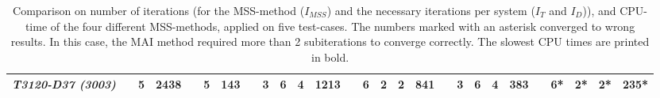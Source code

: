 \documentclass[10pt,journal]{article}
\begin{document}
\begin{table}[!ht]
\begin{adjustbox}{width=1.2\textwidth}
\begin{tabular}{@{}l c cc c cc c cccc c cccc c cccc c cccc  @{}}
\multicolumn{1}{l}{{\textit{T3120-D37 (3003)}}}   && 5 & \textbf{2438} && 5 & 143   &&  3 & 6  & 4  & 1213  && 6 & 2 & 2 &  841   && 3      & 6  & 4  & 383 && 6*  & 2*  & 2* & {235*}  \\
\toprule 
\end{tabular}
\end{adjustbox}
\caption{Comparison on number of iterations (for the MSS-method ($I_{MSS}$) and the necessary iterations per system ($I_T$ and $I_D$)), and CPU-time of the four different MSS-methods, applied on five test-cases. The numbers marked with an asterisk converged to wrong results. In this case, the MAI method required more than 2 subiterations to converge correctly. The slowest CPU times are printed in bold.}
\end{table}
\newpage 
\end{document}
